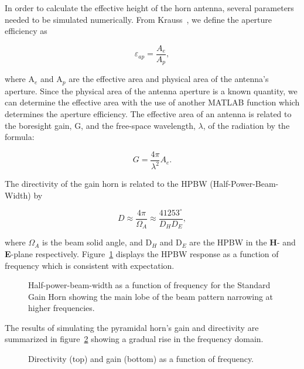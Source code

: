 \par In order to calculate the effective height of the horn antenna, several parameters needed to be simulated numerically.  From Krauss~\cite{Kraus.1988}, we define the aperture efficiency as

\begin{equation}
\varepsilon_{ap} = \frac{A_{e}}{A_{p}},
\end{equation}

\noindent where A$_{e}$ and A$_{p}$ are the effective area and physical area of the antenna's aperture.  Since the physical area of the antenna aperture is a known quantity, we can determine the effective area with the use of another MATLAB function which determines the aperture efficiency.  The effective area of an antenna is related to the boresight gain, G, and the free-space wavelength, $\lambda$, of the radiation by the formula:

\begin{equation}
G = \frac{4\pi}{\lambda^{2}}A_{e}.
\end{equation}

\par The directivity of the gain horn is related to the HPBW (Half-Power-Beam-Width) by

\begin{equation}
D \approx \frac{4\pi}{\Omega_{A}} \approx \frac{41253^{\circ}}{D_{H}D_{E}},
\end{equation}

\noindent where $\Omega_{A}$ is the beam solid angle, and D$_{H}$ and D$_{E}$ are the HPBW in the \textbf{H}- and \textbf{E}-plane respectively.  Figure~\ref{fig:HPBWvsFreq} displays the HPBW response as a function of frequency which is consistent with expectation.

\begin{figure}[htbp]
\centering
\epsfxsize=4.5in
\caption{Half-power-beam-width as a function of frequency for the Standard Gain Horn showing the main lobe of the beam pattern narrowing at higher frequencies.}
\label{fig:HPBWvsFreq}
\end{figure}

\noindent The results of simulating the pyramidal horn's gain and directivity are summarized in figure~\ref{fig:gainDirFreq} showing a gradual rise in the frequency domain.

\begin{figure}[htbp]
\centering
\epsfxsize=4.5in
\caption{Directivity (top) and gain (bottom) as a function of frequency.}
\label{fig:gainDirFreq}
\end{figure}

